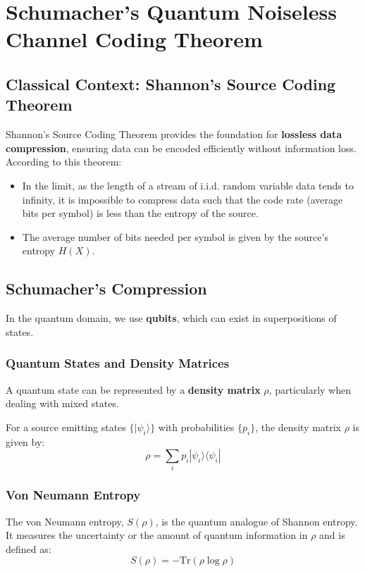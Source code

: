 \section{Schumacher’s Quantum Noiseless Channel Coding Theorem}

\subsection{Classical Context: Shannon's Source Coding Theorem}
Shannon's Source Coding Theorem provides the foundation for \textbf{lossless data compression}, ensuring data can be encoded efficiently without information loss. According to this theorem:
\begin{itemize}
    \item In the limit, as the length of a stream of i.i.d. random variable data tends to infinity, it is impossible to compress data such that the code rate (average bits per symbol) is less than the entropy of the source.
    \item The average number of bits needed per symbol is given by the source's entropy \( H(X) \).
\end{itemize}

\subsection{Schumacher’s Compression}
In the quantum domain, we use \textbf{qubits}, which can exist in superpositions of states.

\subsubsection{Quantum States and Density Matrices}
A quantum state can be represented by a \textbf{density matrix} \( \rho \), particularly when dealing with mixed states.

For a source emitting states \( \{ |\psi_i\rangle \} \) with probabilities \( \{ p_i \} \), the density matrix \( \rho \) is given by:
\begin{equation}
    \rho = \sum_i p_i |\psi_i\rangle \langle\psi_i|
\end{equation}

\subsubsection{Von Neumann Entropy}
The von Neumann entropy, \( S(\rho) \), is the quantum analogue of Shannon entropy. It measures the uncertainty or the amount of quantum information in \( \rho \) and is defined as:
\begin{equation}
    S(\rho) = -\text{Tr}(\rho \log \rho)
\end{equation}


